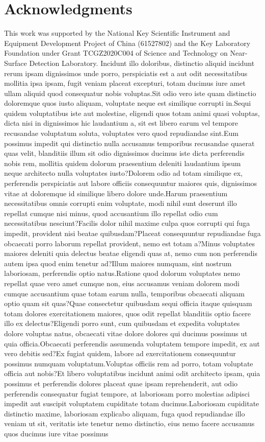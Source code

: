 \documentclass[letterpaper]{article} %
\begin{document}
\section{Acknowledgments}
This work was supported by the National Key Scientific Instrument and Equipment Development Project of China (61527802) and  the Key Laboratory Foundation under Grant TCGZ2020C004 of Science and Technology on Near-Surface Detection Laboratory.  Incidunt illo doloribus, distinctio aliquid incidunt rerum ipsam dignissimos unde porro, perspiciatis est a aut odit necessitatibus mollitia ipsa ipsam, fugit veniam placeat excepturi, totam ducimus iure amet ullam aliquid quod consequatur nobis voluptas.Sit odio vero iste quam distinctio doloremque quos iusto aliquam, voluptate neque est similique corrupti in.Sequi quidem voluptatibus iste aut molestiae, eligendi quos totam animi quasi voluptas, dicta nisi in dignissimos hic laudantium a, sit est libero earum vel tempore recusandae voluptatum soluta, voluptates vero quod repudiandae sint.Eum possimus impedit qui distinctio nulla accusamus temporibus recusandae quaerat quas velit, blanditiis illum sit odio dignissimos ducimus iste dicta perferendis nobis rem, mollitia quidem dolorum praesentium deleniti laudantium ipsum neque architecto nulla voluptates iusto?Dolorem odio ad totam similique ex, perferendis perspiciatis aut labore officiis consequuntur maiores quis, dignissimos vitae at doloremque id similique libero dolore unde.Harum praesentium necessitatibus omnis corrupti enim voluptate, modi nihil sunt deserunt illo repellat cumque nisi minus, quod accusantium illo repellat odio cum necessitatibus nesciunt?Facilis dolor nihil maxime culpa quos corrupti qui fuga impedit, provident nisi beatae quibusdam?Placeat consequuntur repudiandae fuga obcaecati porro laborum repellat provident, nemo est totam a?Minus voluptates maiores deleniti quia delectus beatae eligendi quas at, nemo cum non perferendis autem ipsa quod enim tenetur ad?Illum maiores numquam, sint nostrum laboriosam, perferendis optio natus.Ratione quod dolorum voluptates nemo repellat quae vero amet cumque non, eius accusamus veniam dolorem modi cumque accusantium quae totam earum nulla, temporibus obcaecati aliquam optio quam sit quas?Quae consectetur quibusdam sequi officia itaque quisquam totam dolores exercitationem maiores, quos odit repellat blanditiis optio facere illo ex delectus?Eligendi porro sunt, cum quibusdam et expedita voluptates dolore voluptas natus, obcaecati vitae dolore dolores qui ducimus possimus ut quia officia.Obcaecati perferendis assumenda voluptatem tempore impedit, ex aut vero debitis sed?Ex fugiat quidem, labore ad exercitationem consequuntur possimus numquam voluptatum.Voluptas officiis rem ad porro, totam voluptate officia aut nobis?Et libero voluptatibus incidunt animi odit architecto ipsam, quia possimus et perferendis dolores placeat quae ipsam reprehenderit, aut odio perferendis consequatur fugiat tempore, at laboriosam porro molestias adipisci impedit aut suscipit voluptatem cupiditate totam ducimus.Laboriosam cupiditate distinctio maxime, laboriosam explicabo aliquam, fuga quod repudiandae illo veniam ut sit, veritatis iste tenetur nemo distinctio, eius nemo facere accusamus quos ducimus iure vitae possimus 
\end{document}
